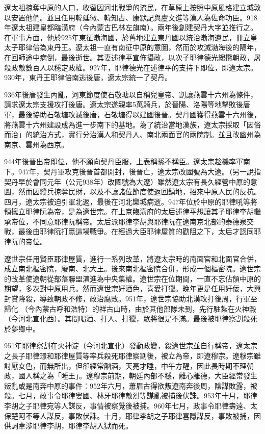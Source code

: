 遼太祖掠奪中原的人口，收留因河北戰爭的流民，在草原上按照中原風格建立城敦以安置他們。並且任用韓延徽、韓知古、康默記與盧文進等漢人為佐命功臣。918年遼太祖建皇都臨潢府（今內蒙古巴林左旗南）。兩年後創建契丹大字並推行之。在軍事方面，他於925年東征渤海國，於舊地建立東丹國以統治渤海遺民，冊立皇太子耶律倍為東丹王。遼太祖一直有南征中原的意圖，然而於攻滅渤海後的隔年，在回師途中病倒，最後逝世。其妻述律平宣佈攝政，以次子耶律德光總攬朝政，屠殺政敵數百人以穩定政權。927年，耶律德光在述律平的支持下即位，即遼太宗。930年，東丹王耶律倍南逃後唐，遼太宗統一了契丹。

936年後唐發生內亂，河東節度使石敬瑭以自稱兒皇帝、割讓燕雲十六州為條件，請求遼太宗支援攻打後唐。遼太宗遂親率5萬騎兵，於晉陽、洛陽等地擊敗後唐軍，最後協助石敬塘攻滅後唐，石敬塘得以建國後晉。契丹國獲得燕雲十六州後，將燕雲十六州建設成為進一步南下的基地。為了統治當地漢族，遼太宗採取「因俗而治」的統治方式，實行分治漢人和契丹人、南北兩面官的兩院制。並且改幽州為南京、雲州為西京。

944年後晉出帝即位，他不願向契丹臣服，上表稱孫不稱臣。遼太宗趁機率軍南下。947年，契丹軍攻克後晉首都開封，後晉亡，遼太宗改國號為大遼。（另一說指契丹早於會同元年（公元938年）改國號為大遼）雖然遼太宗有長久經營中原的意圖，然而因縱兵掠奪民財，以及不讓諸位節度使返回鎮地，招來中原人民的反抗。四月，遼太宗被迫引軍北返，最後在河北欒城病逝。947年位於中原的耶律吼等將領擁立耶律阮為帝，是為遼世宗。在上京臨潢府的太后述律平想讓其子耶律李胡繼承帝位，不同意耶律阮稱帝。太后派耶律李胡與耶律阮在遼南京北部的泰德泉交戰，最後由耶律阮打贏這場戰爭。在經過大臣耶律屋質的勸阻之下，太后才認同耶律阮的帝位。

遼世宗任用賢臣耶律屋質，進行一系列改革，將遼太宗時的南面官和北面官合併，成立南北樞密院，廢南、北大王。後來南北樞密院合併，形成一個樞密院。遼世宗的改革使遼朝從部落聯盟演進為中央集權。遼世宗在位期間，一直不忘佔領中原的期望，多次對中原用兵。然而遼世宗好酒色，喜愛打獵。晚年更是任用奸佞，大興封賞降殺，導致朝政不修，政治腐敗。951年，遼世宗協助北漢攻打後周，行軍至歸化 （今內蒙古呼和浩特）的祥古山時，由於其他部隊未到，先行駐紮在火神澱（今河北宣化西）。其間喝酒、打人、打獵，眾將很是不滿。最後被耶律察割殺死於夢鄉中。

951年耶律察割在火神淀（今河北宣化）發動政變，殺遼世宗並自行稱帝，遼太宗之長子耶律璟和耶律屋質等率兵殺死耶律察割後，被立為帝，即遼穆宗。遼穆宗雖討厭女色，而無所出，但卻經常酗酒，天亮才睡，中午方醒，因此長時期不理朝政，國人稱之為「睡王」。遼穆宗前期，朝廷內部不穩，離心離德，大臣經常發生叛亂或是南奔中原的事件：952年六月，蕭眉古得欲叛遼南奔後周，陰謀敗露，被殺。七月，政事令耶律婁國、林牙耶律敵烈等謀亂被捕後伏誅。953年十月，耶律李胡之子耶律宛等人謀反，事情被察覺後被捕。960年七月，政事令耶律壽遠、太保楚阿不等人謀反，事敗伏誅。十月，耶律李胡之子耶律喜隱謀反，事敗被捕，因供詞牽涉耶律李胡，耶律李胡入獄而死。

